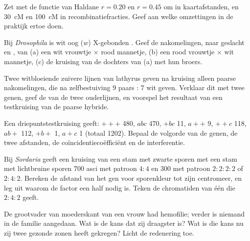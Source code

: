\begin{exercise}[$\star\star$]\label{exo:b2:meiosis-heredity:7}
Zet met de functie van Haldane $r = 0.20$ en $r = 0.45$ om in
kaartafstanden, en \qty{30}{cM} en \qty{100}{cM} in
recombinatiefracties. Geef aan welke omzettingen in de praktijk ertoe doen.
\end{exercise}

\begin{exercise}[$\star\star$]\label{exo:b2:meiosis-heredity:8}
Bij \emph{Drosophila} is wit oog ($w$) X-gebonden . Geef
de nakomelingen, naar geslacht en , van (a) een wit vrouwtje $\times$
rood mannetje, (b) een rood  vrouwtje $\times$ wit mannetje, (c) de
kruising van de dochters van (a) met hun broers.
\end{exercise}

\begin{exercise}[$\star\star$]\label{exo:b2:meiosis-heredity:9}
Twee witbloeiende zuivere lijnen van lathyrus geven na kruising alleen
paarse nakomelingen, die na zelfbestuiving $9$ paars : $7$ wit geven.
Verklaar dit met twee genen, geef de  van de twee ouderlijnen, en
voorspel het resultaat van een testkruising van de paarse hybride.
\end{exercise}

\begin{exercise}[$\star\star\star$]\label{exo:b2:meiosis-heredity:10}
Een driepuntstestkruising geeft: $+++$ 480, $abc$ 470, $+bc$ 11,
$a++$ 9, $++c$ 118, $ab+$ 112, $+b+$ 1, $a+c$ 1 (totaal 1202). Bepaal
de volgorde van de genen, de twee afstanden, de coïncidentiecoëfficiënt
en de interferentie.
\end{exercise}

\begin{exercise}[$\star\star\star$]\label{exo:b2:meiosis-heredity:11}
Bij \emph{Sordaria} geeft een kruising van een stam met zwarte sporen met
een stam met lichtbruine sporen $700$ asci met patroon $4 : 4$ en $300$ met
patroon $2 : 2 : 2 : 2$ of $2 : 4 : 2$. Bereken de afstand van het gen
voor sporenkleur tot zijn centromeer, en leg uit waarom de factor
een half nodig is. Teken de chromatiden van één  die
$2 : 4 : 2$ geeft.
\end{exercise}

\begin{exercise}[$\star\star\star$]\label{exo:b2:meiosis-heredity:12}
De grootvader van moederskant van een vrouw had hemofilie; verder is
niemand in de familie aangedaan. Wat is de kans dat zij draagster is?
Wat is die kans nu zij twee gezonde zonen heeft gekregen? Licht de
redenering toe.
\end{exercise}

